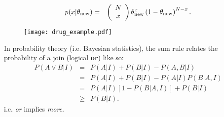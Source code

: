 \documentclass[a4paper, 12pt]{article}
\begin{document}
\begin{eqnarray}
p(x | \theta_{\rm new}) &=&
\left(\begin{array}{cc}N \\ x\end{array}\right)
\theta_{\rm new}^x \left(1 - \theta_{\rm new}\right)^{N - x}.
\end{eqnarray}

\begin{figure}[ht!]
\centering
\texttt{[image: drug\_example.pdf]}
\caption{\label{fig:drug_example}}
\end{figure}

In probability theory (i.e. Bayesian statistics), the sum rule relates the
probability of a join (logical {\bf or}) like so:
\begin{eqnarray}
P(A \vee B | I) &=& P(A | I) + P(B | I) - P(A, B | I)\\
                &=& P(A | I) + P(B | I) - P(A | I)P(B | A, I)\\
                &=& P(A | I)\left[1 - P(B | A,I)\right] + P(B | I)\\
                &\geq& P(B | I). 
\end{eqnarray}
i.e. {\em or} implies {\em more}.
\end{document}
